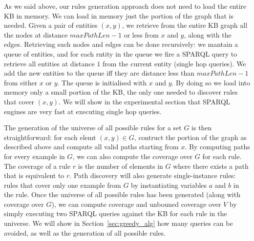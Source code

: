 As we said above, our rules generation approach does not need to load the entire KB in memory. We can load in memory just the portion of the graph that is needed. Given a pair of entities $(x,y)$, we retrieve from the entire KB graph all the nodes at distance $maxPathLen-1$ or less from $x$ and $y$, along with the edges. Retrieving such nodes and edges can be done recursively: we mantain a queue of entities, and for each rntity in the queue we fire a SPARQL query to retrieve all entities at distance $1$ from the current entity (single hop queries). We add the new entities to the queue iff they are distance less than  $maxPathLen-1$ from either $x$ or $y$. The queue is initialised with $x$ and $y$. By doing so we load into memory only a small portion of the KB, the only one needed to discover rules that cover $(x,y)$. We will show in the experimental section that SPARQL engines are very fast at executing single hop queries.

The generation of the universe of all possible rules for a set $G$ is then straightforward: for each elemt $(x,y) \in G$, contruct the portion of the graph as described above and compute all valid paths starting from $x$. By computing paths for every example in $G$, we can also compute the coverage over $G$ for each rule. The coverage of a rule $r$ is the number of elements in $G$ where there exists a path that is equivalent to $r$. Path discovery will also generate single-instance rules: rules that cover only one example from $G$ by instantiating variables $a$ and $b$ in the rule. Once the universe of all possible rules has been generated (along with coverage over $G$), we can compute coverage and unbouned coverage over $V$ by simply executing two SPARQL queries against the KB for each rule in the universe. We will show in Section~\ref{sec:greedy_alg} how many queries can be avoided, as well as the generation of all possible rules.


